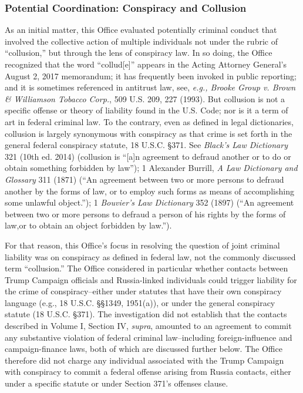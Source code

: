 \subsubsection{Potential Coordination: Conspiracy and Collusion}
As an initial matter, this Office evaluated potentially criminal conduct that involved the collective action of multiple individuals not under the rubric of ``collusion,'' but through the lens of conspiracy law.
In so doing, the Office recognized that the word ``collud[e]'' appears in the Acting Attorney General's August 2, 2017 memorandum; it has frequently been invoked in public reporting; and it is sometimes referenced in antitrust law, see, \textit{e.g., Brooke Group v. Brown \& Williamson Tobacco Corp.}, 509 U.S. 209, 227 (1993).
But collusion is not a specific offense or theory of liability found in the U.S. Code; nor is it a term of art in federal criminal law.
To the contrary, even as defined in legal dictionaries, collusion is largely synonymous with conspiracy as that crime is set forth in the general federal conspiracy statute, 18 U.S.C. \S 371.
See \textit{Black's Law Dictionary} 321 (10th ed. 2014) (collusion is ``[a]n agreement to defraud another or to do or obtain something forbidden by law''); 1 Alexander Burrill, \textit{A Law Dictionary and Glossary} 311 (1871) (``An agreement between two or more persons to defraud another by the forms of law, or to employ such forms as means of accomplishing some unlawful object.''); 1 \textit{Bouvier's Law Dictionary} 352 (1897) (``An agreement between two or more persons to defraud a person of his rights by the forms of law,or to obtain an object forbidden by law.'').

For that reason, this Office's focus in resolving the question of joint criminal liability was on conspiracy as defined in federal law, not the commonly discussed term ``collusion.''
The Office considered in particular whether contacts between Trump Campaign officials and Russia-linked individuals could trigger liability for the crime of conspiracy--either under statutes that have their own conspiracy language (e.g., 18 U.S.C. \S\S 1349, 1951(a)), or under the general conspiracy statute (18 U.S.C. \S 371).
The investigation did not establish that the contacts described in Volume I, Section IV, \textit{supra}, amounted to an agreement to commit any substantive violation of federal criminal law--including foreign-influence and campaign-finance laws, both of which are discussed further below.
The Office therefore did not charge any individual associated with the Trump Campaign with conspiracy to commit a federal offense arising from Russia contacts, either under a specific statute or under Section 371's offenses clause.


